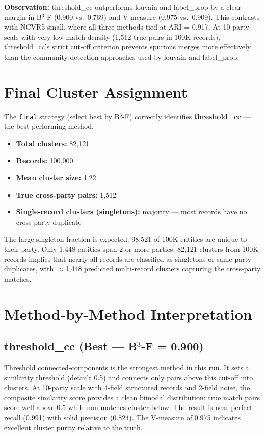 \documentclass[11pt, a4paper]{article}
\begin{document}
\textbf{Observation:} threshold\_cc outperforms louvain and label\_prop by a clear
margin in B$^3$-F (0.900 vs.\ 0.769) and V-measure (0.975 vs.\ 0.909). This contrasts
with NCVR5-small, where all three methods tied at ARI = 0.917. At 10-party scale with
very low match density (1,512 true pairs in 100K records), threshold\_cc's strict
cut-off criterion prevents spurious merges more effectively than the community-detection
approaches used by louvain and label\_prop.

\section{Final Cluster Assignment}

The \texttt{final} strategy (select best by B$^3$-F) correctly identifies
\textbf{threshold\_cc} --- the best-performing method.

\begin{itemize}[noitemsep]
  \item \textbf{Total clusters:} 82,121
  \item \textbf{Records:} 100,000
  \item \textbf{Mean cluster size:} 1.22
  \item \textbf{True cross-party pairs:} 1,512
  \item \textbf{Single-record clusters (singletons):} majority --- most records have no cross-party duplicate
\end{itemize}

The large singleton fraction is expected: 98,521 of 100K entities are unique
to their party. Only 1,448 entities span 2 or more parties; 82,121 clusters
from 100K records implies that nearly all records are classified as singletons
or same-party duplicates, with $\approx$1,448 predicted multi-record clusters
capturing the cross-party matches.

\section{Method-by-Method Interpretation}

\subsection*{threshold\_cc (Best --- B$^3$-F = 0.900)}

Threshold connected-components is the strongest method in this run. It sets a
similarity threshold (default 0.5) and connects only pairs above this cut-off
into clusters. At 10-party scale with 4-field structured records and 2-field
noise, the composite similarity score provides a clean bimodal distribution:
true match pairs score well above 0.5 while non-matches cluster below. The result
is near-perfect recall (0.991) with solid precision (0.824). The V-measure of
0.975 indicates excellent cluster purity relative to the truth.
\end{document}
